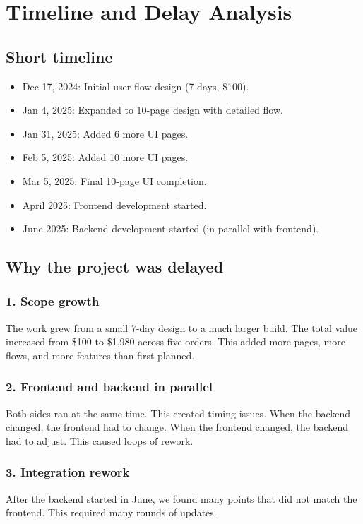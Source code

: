 \chapter{Timeline and Delay Analysis}

\section{Short timeline}
\begin{itemize}
  \item Dec 17, 2024: Initial user flow design (7 days, \$100).
  \item Jan 4, 2025: Expanded to 10-page design with detailed flow.
  \item Jan 31, 2025: Added 6 more UI pages.
  \item Feb 5, 2025: Added 10 more UI pages.
  \item Mar 5, 2025: Final 10-page UI completion.
  \item April 2025: Frontend development started.
  \item June 2025: Backend development started (in parallel with frontend).
\end{itemize}

\section{Why the project was delayed}
\subsection*{1. Scope growth}
The work grew from a small 7-day design to a much larger build. The total value increased from \$100 to \$1{,}980 across five orders. This added more pages, more flows, and more features than first planned.

\subsection*{2. Frontend and backend in parallel}
Both sides ran at the same time. This created timing issues. When the backend changed, the frontend had to change. When the frontend changed, the backend had to adjust. This caused loops of rework.

\subsection*{3. Integration rework}
After the backend started in June, we found many points that did not match the frontend. This required many rounds of updates.

